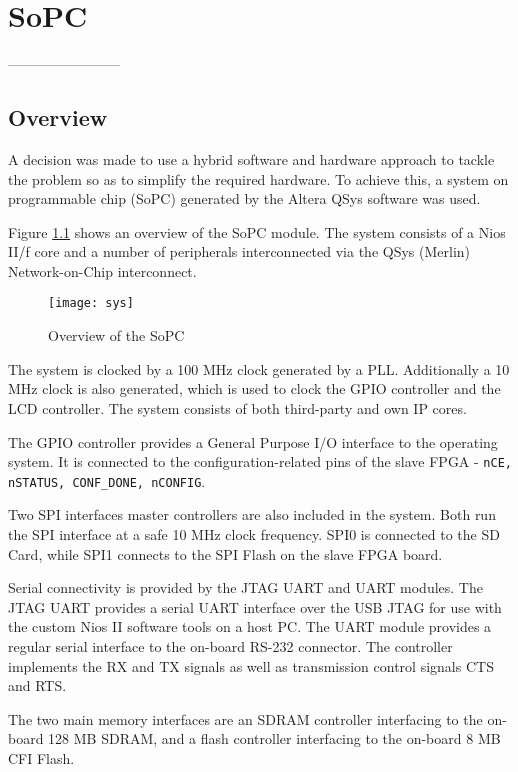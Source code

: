 \chapter{SoPC}
------------------------


\section{Overview}
A decision was made to use a hybrid software and hardware approach to tackle the problem
so as to simplify the required hardware. To achieve this, a system on programmable chip
(SoPC) generated by the Altera QSys software was used.

Figure \ref{figure:sopc_overview} shows an overview of the SoPC module. The system consists of a Nios II/f core
and a number of peripherals interconnected via the QSys (Merlin) Network-on-Chip
interconnect.

\begin{figure}[h!]
\begin{center}
\texttt{[image: sys]}
\caption{Overview of the SoPC}
\label{figure:sopc_overview}
\end{center}
\end{figure}

The system is clocked by a 100 MHz clock generated by a PLL. Additionally a 10 MHz clock
is also generated, which is used to clock the GPIO controller and the LCD controller. The
system consists of both third-party and own IP cores.

The GPIO controller provides a General Purpose I/O interface to the operating system. It
is connected to the configuration-related pins of the slave FPGA - \texttt{nCE, nSTATUS,
CONF\_DONE, nCONFIG}.

Two SPI interfaces master controllers are also included in the system. Both run the SPI
interface at a safe 10 MHz clock frequency. SPI0 is connected to the SD Card, while SPI1
connects to the SPI Flash on the slave FPGA board.

Serial connectivity is provided by the JTAG UART and UART modules. The JTAG UART
provides a serial UART interface over the USB JTAG for use with the custom Nios II software
tools on a host PC. The UART module provides a regular serial interface to the on-board
RS-232 connector. The controller implements the RX and TX signals as well as transmission control
signals CTS and RTS.

The two main memory interfaces are an SDRAM controller interfacing to the on-board 128 MB
SDRAM, and a flash controller interfacing to the on-board 8 MB CFI Flash.

